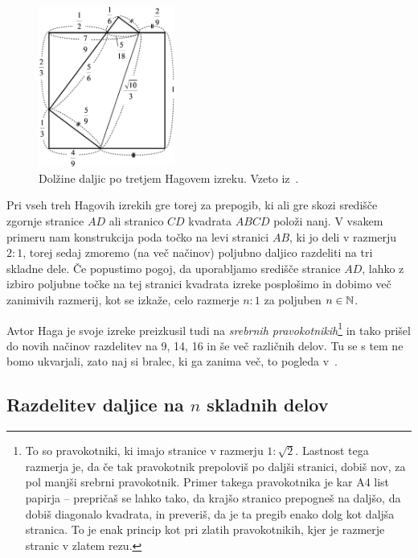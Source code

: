 \begin{figure}[h]
    \centering
    \includegraphics[width=0.4\textwidth]{images/hagovi_izreki/hagov_izrek3_stevilke.png}
    \caption[Tretji Hagov izrek v številkah]{Dolžine daljic po tretjem Hagovem izreku. Vzeto iz~\cite[str. 19]{haga2008}.}
    \label{fig:hagov_izrek3_st}
\end{figure}

Pri vseh treh Hagovih izrekih gre torej za prepogib, ki ali gre skozi središče zgornje stranice $AD$ ali stranico $CD$ kvadrata $ABCD$ položi nanj. V vsakem primeru nam konstrukcija poda točko na levi stranici $AB$, ki jo deli v razmerju $2:1$, torej sedaj zmoremo (na več načinov) poljubno daljico razdeliti na tri skladne dele. Če popustimo pogoj, da uporabljamo središče stranice $AD$, lahko z izbiro poljubne točke na tej stranici kvadrata izreke posplošimo in dobimo več zanimivih razmerij, kot se izkaže, celo razmerje $n:1$ za poljuben $n \in \mathbb N$.

Avtor Haga je svoje izreke preizkusil tudi na \emph{srebrnih pravokotnikih}\footnote{To so pravokotniki, ki imajo stranice v razmerju $1 : \sqrt{2}$. Lastnost tega razmerja je, da če tak pravokotnik prepoloviš po daljši stranici, dobiš nov, za pol manjši srebrni pravokotnik. Primer takega pravokotnika je kar A4 list papirja -- prepričaš se lahko tako, da krajšo stranico prepogneš na daljšo, da dobiš diagonalo kvadrata, in preveriš, da je ta pregib enako dolg kot daljša stranica. To je enak princip kot pri zlatih pravokotnikih, kjer je razmerje stranic v zlatem rezu.} in tako prišel do novih načinov razdelitev na 9, 14, 16 in še več različnih delov. Tu se s tem ne bomo ukvarjali, zato naj si bralec, ki ga zanima več, to pogleda v~\cite[str.\ 21--32]{haga2008}.

\subsection{Razdelitev daljice na $n$ skladnih delov}

